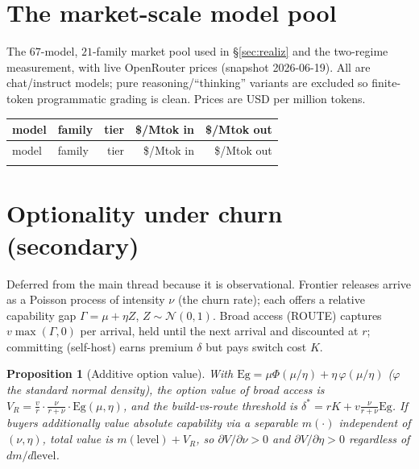 \documentclass[11pt]{article}
\theoremstyle{plain}
\newtheorem{proposition}{Proposition}
\theoremstyle{definition}
\begin{document}
\section{The market-scale model pool}\label{app:roster}
The $67$-model, $21$-family market pool used in \S\ref{sec:realiz} and the two-regime measurement, with live OpenRouter prices
(snapshot 2026-06-19). All are chat/instruct models; pure reasoning/``thinking'' variants are excluded so finite-token
programmatic grading is clean. Prices are USD per million tokens.
\begin{center}\scriptsize
\begin{longtable}{llrrr}
\toprule
model & family & tier & \$/Mtok in & \$/Mtok out \\
\midrule
\endfirsthead
\toprule model & family & tier & \$/Mtok in & \$/Mtok out \\ \midrule \endhead
\bottomrule \endfoot

\end{longtable}
\end{center}

\section{Optionality under churn (secondary)}\label{app:churn}
Deferred from the main thread because it is observational. Frontier releases
arrive as a Poisson process of intensity $\nu$ (the churn rate); each offers a relative capability gap $\Gamma=\mu+\eta Z$,
$Z\sim\mathcal N(0,1)$. Broad access (ROUTE) captures $v\max(\Gamma,0)$ per arrival, held until the next arrival and discounted at
$r$; committing (self-host) earns premium $\delta$ but pays switch cost $K$.

\begin{proposition}[Additive option value]\label{prop:option}
With $\mathrm{Eg}=\mu\Phi(\mu/\eta)+\eta\,\varphi(\mu/\eta)$ ($\varphi$ the standard normal density), the option value of broad
access is $V_R=\tfrac{v}{r}\cdot\tfrac{\nu}{r+\nu}\cdot\mathrm{Eg}(\mu,\eta)$, and the build-vs-route threshold is
$\delta^\ast=rK+v\tfrac{\nu}{r+\nu}\mathrm{Eg}$. If buyers additionally value absolute capability via a separable
$m(\cdot)$ independent of $(\nu,\eta)$, total value is $m(\text{level})+V_R$, so $\partial V/\partial\nu>0$ and
$\partial V/\partial\eta>0$ regardless of $dm/d\text{level}$.
\end{proposition}
\end{document}
